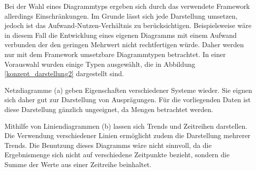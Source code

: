 Bei der Wahl eines Diagrammtyps ergeben sich durch das verwendete Framework allerdings Einschränkungen. Im Grunde lässt sich jede Darstellung umsetzen, jedoch ist das Aufwand-Nutzen-Verhältnis zu berücksichtigen. Beispielsweise wäre in diesem Fall die Entwicklung eines eigenen Diagramms mit einem Aufwand verbunden der den geringen Mehrwert nicht rechtfertigen würde. Daher werden nur mit dem Framework umsetzbare Diagrammtypen betrachtet. In einer Vorauswahl wurden einige  Typen ausgewählt, die in Abbildung \ref{konzept_darstellung2} dargestellt sind. 

Netzdiagramme (a) geben Eigenschaften verschiedener Systeme wieder. Sie eignen sich daher gut zur Darstellung von Ausprägungen. Für die vorliegenden Daten ist diese Darstellung gänzlich ungeeignet, da Mengen betrachtet werden. 

Mithilfe von Liniendiagrammen (b) lassen sich Trends und Zeitreihen darstellen. Die Verwendung verschiedener Linien ermöglicht zudem die Darstellung mehrerer Trends. Die Benutzung dieses Diagramms wäre nicht sinnvoll, da die Ergebnismenge sich nicht auf verschiedene Zeitpunkte bezieht, sondern die Summe der Werte aus einer Zeitreihe beinhaltet.

